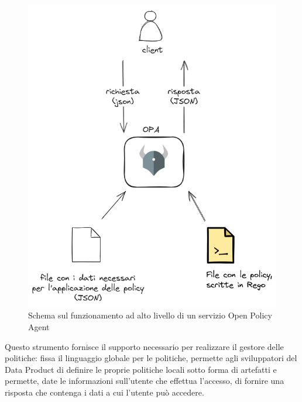 \documentclass[12pt]{report}
\begin{document}
\begin{figure}[H]
    \centering
    \includegraphics[width= 0.75\linewidth]{immagini/Opa funzionamento.png}
    \caption{Schema sul funzionamento ad alto livello di un servizio Open Policy Agent}
    \label{OPA image}
\end{figure}
Questo strumento fornisce il supporto necessario per realizzare il gestore delle politiche: fissa il linguaggio globale per le politiche, permette agli sviluppatori del Data Product di definire le proprie politiche locali sotto forma di artefatti e permette, date le informazioni sull'utente che effettua l'accesso, di fornire una risposta che contenga i dati a cui l'utente può accedere.
\end{document}
